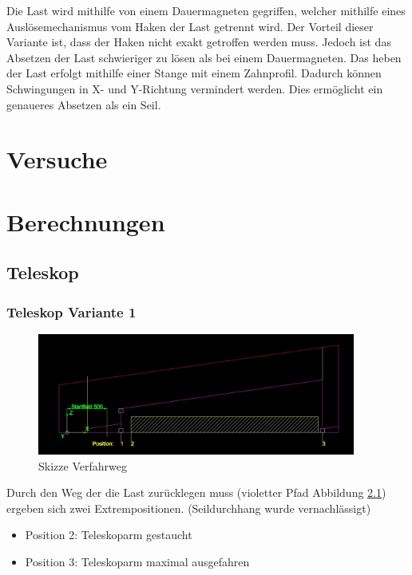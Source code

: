 \documentclass[a4paper]{report}
\begin{document}
Die Last wird mithilfe von einem Dauermagneten gegriffen, welcher mithilfe eines Auslösemechanismus vom Haken der Last getrennt wird. Der Vorteil dieser Variante ist, dass der Haken nicht exakt getroffen werden muss. Jedoch ist das Absetzen der Last schwieriger zu lösen als bei einem Dauermagneten. Das heben der Last erfolgt mithilfe einer Stange mit einem Zahnprofil. Dadurch können Schwingungen in X- und Y-Richtung vermindert werden. Dies ermöglicht ein genaueres Absetzen als ein Seil.

\chapter{Versuche}
\label{app:ch:Versuche}


\chapter{Berechnungen}
\label{app:ch:Berechnung}
\section{Teleskop}
\label{app:sec:Teleskjope}
\subsection{Teleskop Variante 1}
\label{app:ssec:TeleskopjeVar1}
\begin{figure}[h]
	\centering
	\includegraphics[keepaspectratio,height=4cm]{Teleskoparm1.JPG}
	\caption{Skizze Verfahrweg}
	\label{fig:Skizze Verfahrweg}
\end{figure}

Durch den Weg der die Last zurücklegen muss (violetter Pfad Abbildung \ref{fig:Skizze Verfahrweg}) ergeben sich zwei Extrempositionen.
(Seildurchhang wurde vernachlässigt)


\begin{itemize}[noitemsep]
	\item Position 2: Teleskoparm gestaucht
	\item Position 3: Teleskoparm maximal ausgefahren
\end{itemize}
\end{document}
